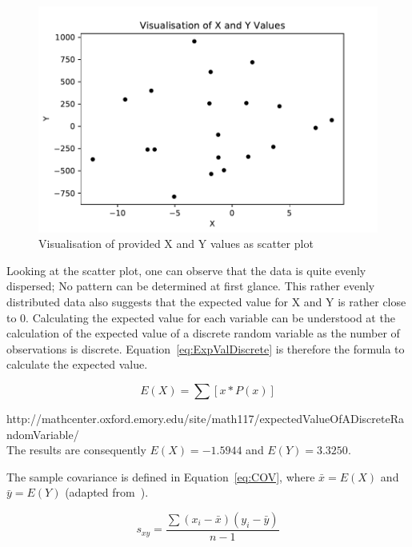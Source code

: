 \begin{figure}[h]
\centering
\includegraphics[width=16cm]{pics/WorkbookAssignment2a.pdf}
\caption{Visualisation of provided X and Y values as scatter plot}
\label{fig:WorkbookAssignment2a}
\end{figure}
\FloatBarrier

Looking at the scatter plot, one can observe that the data is quite evenly dispersed; No pattern can be determined at first glance. This rather evenly distributed data also suggests that the expected value for X and Y is rather close to 0. Calculating the expected value for each variable can be understood at the calculation of the expected value of a discrete random variable as the number of observations is discrete. Equation~\ref{eq:ExpValDiscrete} is therefore the formula to calculate the expected value. 


\begin{equation}  E(X) = \sum [x * P(x)]
\label{eq:ExpValDiscrete}
\end{equation}

http://mathcenter.oxford.emory.edu/site/math117/expectedValueOfADiscreteRandomVariable/
\\

The results are consequently $E(X) = -1.5944$ and $E(Y) = 3.3250$.

The sample covariance is defined in Equation~\ref{eq:COV}, where $\bar{x} = E(X)$ and $\bar{y} = E(Y)$ (adapted from~\cite{bruce2017practical}).

\begin{equation}  s_{xy} = \frac{\sum(x_{i}-\bar{x})(y_{i}-\bar{y})}{n-1}
\label{eq:COV}
\end{equation}

